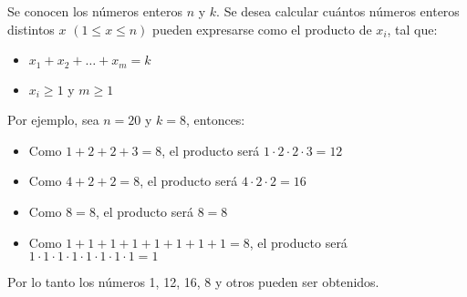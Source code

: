 Se conocen los números enteros $n$ y $k$. Se desea calcular cuántos números enteros distintos $x$ $(1\le x \le n)$ pueden expresarse como el producto de $x_i$, tal que:
\begin{itemize}
  \item $x_1 + x_2 + \hdots + x_m = k $
  \item $x_i \ge 1$ y $m \ge 1$
\end{itemize}

Por ejemplo, sea $n = 20$ y $k=8$, entonces:\\
\begin{itemize}
  \item Como $1+2+2+3 = 8$, el producto será $1 \cdot 2\cdot 2 \cdot 3 = 12$
  \item Como $4+2+2=8$, el producto será $4\cdot 2\cdot 2  = 16$
  \item Como $8=8$, el producto será $8=8$
  \item Como $1+1+1+1+1+1+1+1 = 8$, el producto será $1\cdot1\cdot1\cdot1\cdot1\cdot1\cdot1\cdot1 = 1$
\end{itemize}
Por lo tanto los números 1, 12, 16, 8 y otros pueden ser obtenidos.



\sampleio
